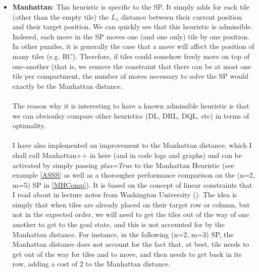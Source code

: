 \begin{itemize}
\item \textbf{Manhattan}: This heuristic is specific to the SP. It simply adds for each tile (other than the empty tile) the $L_{1}$ distance between their current position and their target position. We can quickly see that this heuristic is admissible. Indeeed, each move in the SP moves one (and one only) tile by one position. In other puzzles, it is generally the case that a move will affect the position of many tiles (e.g. RC). Therefore, if tiles could somehow freely move on top of one-another (that is, we remove the constraint that there can be at most one tile per compartment, the number of moves necessary to solve the SP would exactly be the Manhattan distance.
\\
\\
The reason why it is interesting to have a known admissible heuristic is that we can obvioulsy compare other heuristics (DL, DRL, DQL, etc) in terms of optimality.
\\
\\
I have also implemented an improvement to the Manhattan distance, which I shall call Manhattan++ in here (and in code logs and graphs) and can be activated by simply passing \textit{plus=True} to the Manhattan Heuristic (see example \ref{ASSS} as well as a thorougher performance comparison on the (n=2, m=5) SP in \ref{MHComp}). It is based on the concept of linear constraints that I read about in lecture notes from Washington University (\cite{SlidingPuzzleLectureNotes}). The idea is simply that when tiles are already placed on their target row or column, but not in the expected order, we will need to get the tiles out of the way of one another to get to the goal state, and this is not accounted for by the Manhattan distance. For instance, in the following (n=2, m=3) SP, the Manhattan distance does not account for the fact that, at best, tile  \black needs to get out of the way for tiles  \black and  \black to move, and then needs to get back in its row, adding a cost of 2 to the Manhattan distance.

\begin{center}
\begin{five}
\end{five}
\end{center}


\end{itemize}
